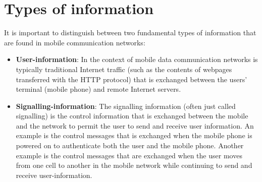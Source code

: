 \section{Types of information}
It is important to distinguish between two fundamental types of information that are found in mobile communication networks:
\begin{itemize}
%
\item\textbf{User-information}: In the context of mobile data communication networks is typically traditional Internet traffic (such as the contents of webpages transferred with the HTTP protocol) that is exchanged between the users' terminal (mobile phone) and remote Internet servers.
%
\item\textbf{Signalling-information}: The signalling information (often just called signalling) is the control information that is exchanged between the mobile and the network to permit the user to send and receive user information. An example is the control messages that is exchanged when the mobile phone is powered on to authenticate both the user and the mobile phone. Another example is the control messages that are exchanged when the user moves from one cell to another in the mobile network while continuing to send and receive user-information.
%
\end{itemize}
